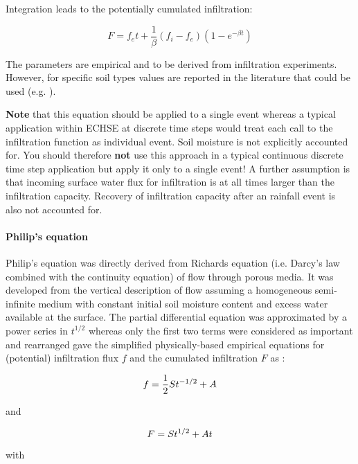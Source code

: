 \noindent
Integration leads to the potentially cumulated infiltration:

\begin{equation}
F = f_e t + \frac{1}{\beta} (f_i - f_e) (1 - e^{- \beta t})
\end{equation}

The parameters are empirical and to be derived from infiltration experiments. However, for specific soil types values are reported in the literature that could be used (e.g. \citet{Maidment1993}).

\textbf{Note} that this equation should be applied to a single event whereas a typical application within ECHSE at discrete time steps would treat each call to the infiltration function as individual event. Soil moisture is not explicitly accounted for. You should therefore \textbf{not} use this approach in a typical continuous discrete time step application but apply it only to a single event! A further assumption is that incoming surface water flux for infiltration is at all times larger than the infiltration capacity. Recovery of infiltration capacity after an rainfall event is also not accounted for.


\paragraph{Philip's equation}\label{sec:inf:philip}
Philip's equation was directly derived from Richards equation (i.e. Darcy's law combined with the continuity equation) of flow through porous media. It was developed from the vertical description of flow assuming a homogeneous semi-infinite medium with constant initial soil moisture content and excess water available at the surface. The partial differential equation was approximated by a power series in $t^{1/2}$ whereas only the first two terms were considered as important and rearranged gave the simplified physically-based empirical equations for (potential) infiltration flux $f$ and the cumulated infiltration $F$ as \citep{Philip1957a,Philip1957d}:

\begin{equation}
f = \frac{1}{2} S t^{-1/2} + A
\end{equation}

\noindent
and

\begin{equation}
F = S t^{1/2} + A t
\end{equation}

\noindent
with\\ \vspace*{2ex}

